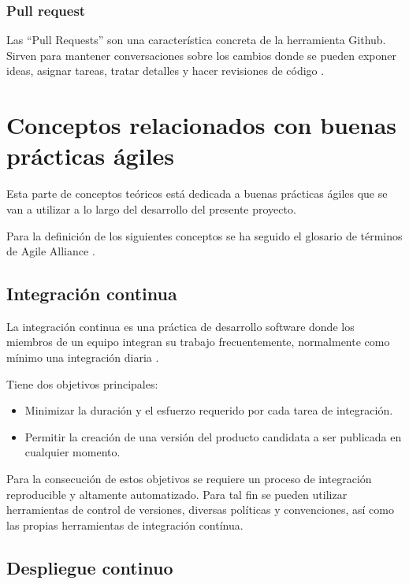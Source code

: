 \subsubsection{Pull request}

Las ``Pull Requests'' son una característica concreta de la herramienta Github. Sirven para mantener conversaciones sobre los cambios donde se pueden exponer ideas, asignar tareas, tratar detalles y hacer revisiones de código \cite{github:features}.

\section{Conceptos relacionados con buenas prácticas ágiles}

Esta parte de conceptos teóricos está dedicada a buenas prácticas ágiles que se van a utilizar a lo largo del desarrollo del presente proyecto.

Para la definición de los siguientes conceptos se ha seguido el glosario de términos de Agile Alliance \cite{agilealliance:glossary}.

\subsection{Integración continua}

La integración continua es una práctica de desarrollo software donde los miembros de un equipo integran su trabajo frecuentemente, normalmente como mínimo una integración diaria \cite{fowler2006continuous}.

Tiene dos objetivos principales:

\begin{itemize}
	\item Minimizar la duración y el esfuerzo requerido por cada tarea de integración.
	\item Permitir la creación de una versión del producto candidata a ser publicada en cualquier momento.
\end{itemize}

Para la consecución de estos objetivos se requiere un proceso de integración reproducible y altamente automatizado. Para tal fin se pueden utilizar herramientas de control de versiones, diversas políticas y convenciones, así como las propias herramientas de integración contínua.

\subsection{Despliegue continuo}


